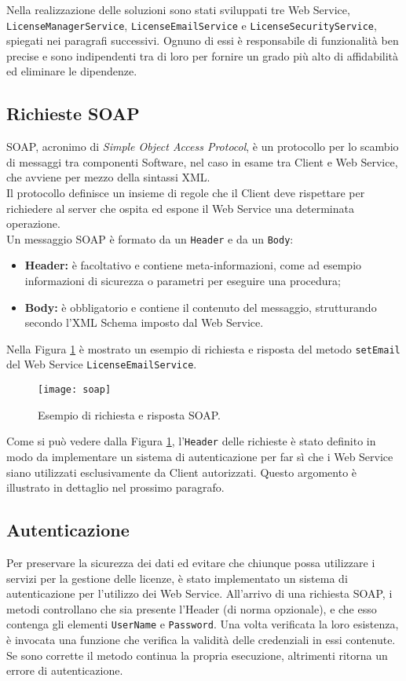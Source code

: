 Nella realizzazione delle soluzioni sono stati sviluppati tre Web Service,\\ \texttt{LicenseManagerService}, \texttt{LicenseEmailService} e \texttt{LicenseSecurityService}, spiegati nei paragrafi successivi. Ognuno di essi è responsabile di funzionalità ben precise e sono indipendenti tra di loro per fornire un grado più alto di affidabilità ed eliminare le dipendenze.


\subsection{Richieste SOAP}
\label{soap}
SOAP, acronimo di \textit{Simple Object Access Protocol}, è un protocollo per lo scambio di messaggi tra componenti Software, nel caso in esame tra Client e Web Service, che avviene per mezzo della sintassi XML. \\
Il protocollo definisce un insieme di regole che il Client deve rispettare per richiedere al server che ospita ed espone il Web Service una determinata operazione.
\\
Un messaggio SOAP è formato da un \texttt{Header} e da un \texttt{Body}:
\begin{itemize}
\item \textbf{Header:} è facoltativo e contiene meta-informazioni, come ad esempio informazioni di sicurezza o parametri per eseguire una procedura;
\item \textbf{Body:} è obbligatorio e contiene il contenuto del messaggio, strutturando secondo l'\gls{XML Schema} imposto dal Web Service.
\end{itemize}

Nella Figura \ref{soap} è mostrato un esempio di richiesta e risposta del metodo \texttt{setEmail} del Web Service \texttt{LicenseEmailService}.

\begin{figure}[!h] 
    \centering 
    \texttt{[image: soap]} 
    \caption{Esempio di richiesta e risposta SOAP.}
    \label{soap}
\end{figure}

Come si può vedere dalla Figura \ref{soap}, l'\texttt{Header} delle richieste è stato definito in modo da implementare un sistema di autenticazione per far sì che i Web Service siano utilizzati esclusivamente da Client autorizzati. Questo argomento è illustrato in dettaglio nel prossimo paragrafo.

\subsection{Autenticazione}
Per preservare la sicurezza dei dati ed evitare che chiunque possa utilizzare i servizi per la gestione delle licenze, è stato implementato un sistema di autenticazione per l'utilizzo dei Web Service. All'arrivo di una richiesta SOAP, i metodi controllano che sia presente l'Header (di norma opzionale), e che esso contenga gli elementi \texttt{UserName} e \texttt{Password}. Una volta verificata la loro esistenza, è invocata una funzione che verifica la validità delle credenziali in essi contenute. Se sono corrette il metodo continua la propria esecuzione, altrimenti ritorna un errore di autenticazione.

